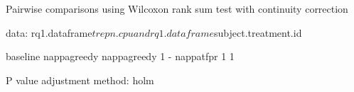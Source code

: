 
	Pairwise comparisons using Wilcoxon rank sum test with continuity correction 

data:  rq1.dataframe$trepn.cpu and rq1.dataframe$subject.treatment.id 

            baseline nappagreedy
nappagreedy 1        -          
nappatfpr   1        1          

P value adjustment method: holm 
